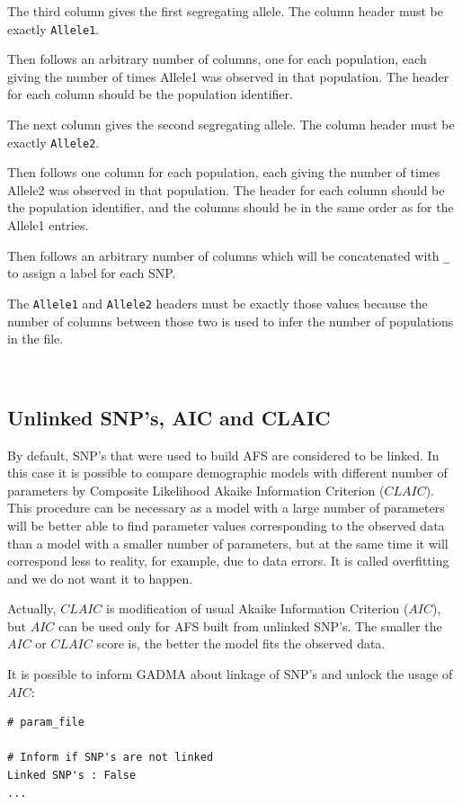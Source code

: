 \documentclass[12pt]{article}
\makeatletter
\newcommand{\py}[1]{\lstinline[language=Python, showstringspaces=False]@#1@}
\makeatother
\begin{document}
The third column gives the first segregating allele.
The column header must be exactly \py{Allele1}.

Then follows an arbitrary number of columns, one for each population, each giving the number of times Allele1 was observed in that population.
The header for each column should be the population identifier.

The next column gives the second segregating allele.
The column header must be exactly \py{Allele2}.

Then follows one column for each population, each giving the number of times Allele2 was observed in that population.
The header for each column should be the population identifier, and the columns should be in the same order as for the Allele1 entries.

Then follows an arbitrary number of columns which will be concatenated with \py{_} to assign a label for each SNP.

The \py{Allele1} and \py{Allele2} headers must be exactly those values because the number of columns between those two is used to infer the number of populations in the file.

~\
\subsection{Unlinked SNP's, AIC and CLAIC}

By default, SNP's that were used to build AFS are considered to be linked. In this case it is possible to compare demographic models with different number of parameters by Composite Likelihood Akaike Information Criterion ($CLAIC$). This procedure can be necessary as a model with a large number of parameters will be better able to find parameter values corresponding to the observed data than a model with a smaller number of parameters, but at the same time it will correspond less to reality, for example, due to data errors. It is called overfitting and we do not want it to happen.

Actually, $CLAIC$ is modification of usual Akaike Information Criterion ($AIC$), but $AIC$ can be used only for AFS built from unlinked SNP's. The smaller the $AIC$ or $CLAIC$ score is, the better the model fits the observed data.

It is possible to inform GADMA about linkage of SNP's and unlock the usage of $AIC$:

\begin{lstlisting}
# param_file

# Inform if SNP's are not linked
Linked SNP's : False
...
\end{lstlisting}
\end{document}
